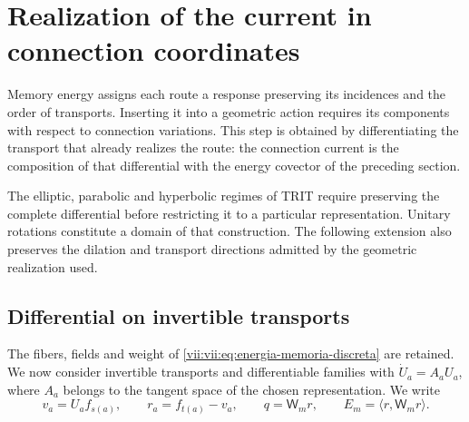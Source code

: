 
\section{Realization of the current in connection coordinates}
\label{vii:vii:sec:composicion-corriente-conexion}

Memory energy assigns each route a response preserving its
incidences and the order of transports. Inserting it into a geometric
action requires its components with respect to connection
variations. This step is obtained by differentiating the transport that already realizes
the route: the connection current is the composition of that differential
with the energy covector of the preceding section.

The elliptic, parabolic and hyperbolic regimes of TRIT require
preserving the complete differential before restricting it to a
particular representation. Unitary rotations constitute a
domain of that construction. The following extension also preserves
the dilation and transport directions admitted by the geometric
realization used.

\subsection{Differential on invertible transports}

The fibers, fields and weight of
\eqref{vii:vii:eq:energia-memoria-discreta} are retained. We now consider invertible
transports and differentiable families with
\(\dot U_a=A_aU_a\), where \(A_a\) belongs to the tangent space
of the chosen representation. We write
\[
 v_a=U_af_{s(a)},\qquad r_a=f_{t(a)}-v_a,\qquad
 q=\mathsf W_mr,\qquad E_m=\langle r,\mathsf W_mr\rangle.
\]

